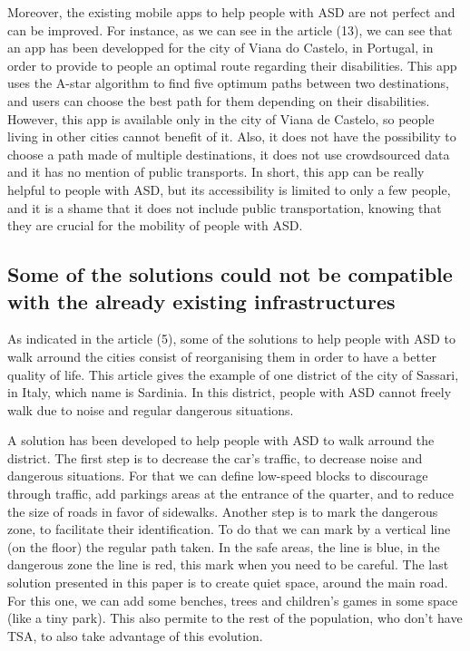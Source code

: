 Moreover, the existing mobile apps to help people with ASD are not perfect and can be improved. For instance, as we can see in the article (13), we can see that an app has been developped for the city of Viana do Castelo, in Portugal, in order to provide to people an optimal route regarding their disabilities. This app uses the A-star algorithm to find five optimum paths between two destinations, and users can choose the best path for them depending on their disabilities. However, this app is available only in the city of Viana de Castelo, so people living in other cities cannot benefit of it. Also, it does not have the possibility to choose a path made of multiple destinations, it does not use crowdsourced data and it has no mention of public transports. In short, this app can be really helpful to people with ASD, but its accessibility is limited to only a few people, and it is a shame that it does not include public transportation, knowing that they are crucial for the mobility of people with ASD.  
\subsection{Some of the solutions could not be compatible with the already existing infrastructures}
As indicated in the article (5), some of the solutions to help people with ASD to walk arround the cities consist of reorganising them in order to have a better quality of life. This article gives the example of one district of the city of Sassari, in Italy, which name is Sardinia. In this district, people with ASD cannot freely walk due to noise and regular dangerous situations. 

A solution has been developed to help people with ASD to walk arround the district. The first step is to decrease the car’s traffic, to decrease noise and dangerous situations.  For that we can define low-speed blocks to discourage through traffic, add parkings areas at the entrance of the quarter, and to reduce the size of roads in favor of sidewalks. Another step is to mark the dangerous zone, to facilitate their identification. To do that we can mark by a vertical line (on the floor) the regular path taken. In the safe areas, the line is blue, in the dangerous zone the line is red, this mark when you need to be careful. The last solution presented in this paper is to create quiet space, around the main road. For this one, we can add some benches, trees and children's games in some space (like a tiny park). This also permite to the rest of the population, who don’t have TSA, to also take advantage of this evolution.

